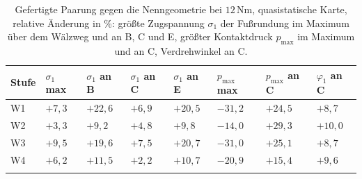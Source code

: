 \begin{table}[!htbp]
	\caption{Gefertigte Paarung gegen die Nenngeometrie bei $12$\,Nm, quasistatische Karte, relative Änderung in \%: größte Zugspannung $\sigma_{\mathrm{1}}$ der Fußrundung im Maximum über dem Wälzweg und an B, C und E, größter Kontaktdruck $p_{\mathrm{max}}$ im Maximum und an C, Verdrehwinkel an C.}
	\label{tab:gemessen_vergleich}
	\centering
	\footnotesize
	\setlength{\tabcolsep}{4pt}
	\begin{tabular}{L{1.2cm}L{1.7cm}L{1.5cm}L{1.5cm}L{1.5cm}L{1.9cm}L{1.6cm}L{1.9cm}}
		Stufe & $\sigma_{\mathrm{1}}$ max & $\sigma_{\mathrm{1}}$ an B & $\sigma_{\mathrm{1}}$ an C & $\sigma_{\mathrm{1}}$ an E & $p_{\mathrm{max}}$ max & $p_{\mathrm{max}}$ an C & $\varphi_{\mathrm{1}}$ an C \\
		\hline
		W1    & $+7{,}3$            & $+22{,}6$            & $+6{,}9$             & $+20{,}5$            & $-31{,}2$        & $+24{,}5$         & $+8{,}7$              \\
		\hline
		W2    & $+3{,}3$            & $+9{,}2$             & $+4{,}8$             & $+9{,}8$             & $-14{,}0$        & $+29{,}3$         & $+10{,}0$             \\
		\hline
		W3    & $+9{,}5$            & $+19{,}6$            & $+7{,}5$             & $+20{,}7$            & $-31{,}0$        & $+25{,}1$         & $+8{,}7$              \\
		\hline
		W4    & $+6{,}2$            & $+11{,}5$            & $+2{,}2$             & $+10{,}7$            & $-20{,}9$        & $+15{,}4$         & $+9{,}6$              \\
		\hline
	\end{tabular}
\end{table}

